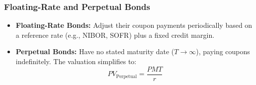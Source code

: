 
\subsubsection{Floating-Rate and Perpetual Bonds}
\begin{itemize}
	\item \textbf{Floating-Rate Bonds:} Adjust their coupon payments periodically based on a reference rate (e.g., NIBOR, SOFR) plus a fixed credit margin.
	\item \textbf{Perpetual Bonds:} Have no stated maturity date ($T \to \infty$), paying coupons indefinitely. The valuation simplifies to:
	      \begin{equation}
		      PV_{\text{Perpetual}} = \frac{PMT}{r}
		      \label{eq:pv_perpetual_bond_m4}
	      \end{equation}
\end{itemize}


